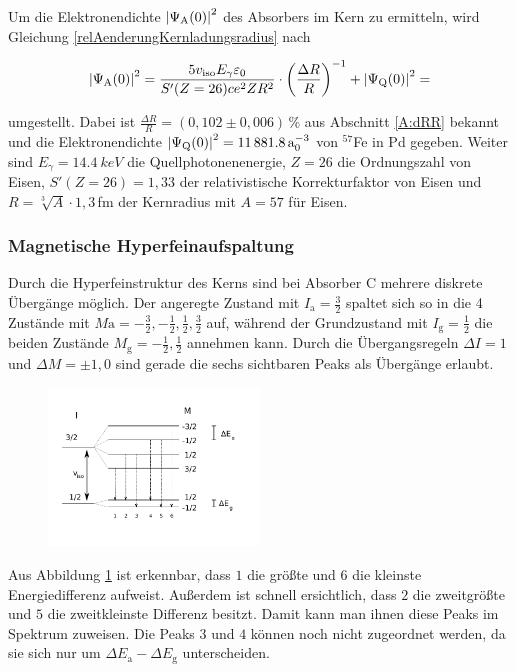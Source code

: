 \documentclass[
a4paper,                %
titlepage=firstiscover, %
captions=tableheading,  %
toc=bibliography,       %
toc=listof,             %
oneside,                %
automark,               %
12pt,                   %
english, ngerman,       %
parskip = half,         %
]{scrartcl}
\begin{document}
Um die Elektronendichte $\abs{\Psi_\text{A}(0)}^2$ des Absorbers im Kern zu ermitteln, wird Gleichung \ref{relAenderungKernladungsradius} nach

\begin{align}
\abs{\Psi_\text{A}(0)}^2 = \frac{5 v_\text{iso} E_\gamma \varepsilon_0}{S'(Z = 26) c e^2 Z R^2}\cdot\left( \frac{\Delta R}{R}\right) ^{-1} + \abs{\Psi_\text{Q}(0)}^2 = 
\end{align}

\noindent umgestellt.
Dabei ist $\frac{\Delta R}{R}=(0,102\pm 0,006)\,$\% aus Abschnitt \ref{A:dRR} bekannt und die Elektronendichte $\abs{\Psi_\text{Q}(0)}^2 = \SI{11881,8}{a_0^{-3}}$ von $^57$Fe in Pd gegeben.
Weiter sind $E_\gamma = \SI{14,4}{keV}$ die Quellphotonenenergie, $Z=26$ die Ordnungszahl von Eisen, $S'(Z = 26) = 1,33$ der relativistische Korrekturfaktor von Eisen und $R=\sqrt[3]{A}\cdot 1,3\,$fm der Kernradius mit $A=57$ für Eisen.


\subsubsection{Magnetische Hyperfeinaufspaltung}

Durch die Hyperfeinstruktur des Kerns sind bei Absorber C mehrere diskrete Übergänge möglich.
Der angeregte Zustand mit $I_\text{a} = \frac{3}{2}$ spaltet sich so in die 4 Zustände mit $M\text{a} = -\frac{3}{2}, -\frac{1}{2}, \frac{1}{2}, \frac{3}{2}$ auf, während der Grundzustand mit $I_\text{g} = \frac{1}{2}$ die beiden Zustände $M_\text{g} = -\frac{1}{2}, \frac{1}{2}$ annehmen kann.
Durch die Übergangsregeln $\Delta I = 1$ und $\Delta M = \pm 1, 0$ sind gerade die sechs sichtbaren Peaks als Übergänge erlaubt.

\begin{figure}[H]
	\centering
	\includegraphics[width=0.5\textwidth]{img/transition}
	\caption{}
	\label{fig:transition}
\end{figure}

\noindent Aus Abbildung \ref{fig:transition} ist erkennbar, dass $1$ die größte und $6$ die kleinste Energiedifferenz aufweist.
Außerdem ist schnell ersichtlich, dass $2$ die zweitgrößte und $5$ die zweitkleinste Differenz besitzt.
Damit kann man ihnen diese Peaks im Spektrum zuweisen.
Die Peaks $3$ und $4$ können noch nicht zugeordnet werden, da sie sich nur um $\Delta E_\text{a} - \Delta E_\text{g}$ unterscheiden.
\end{document}

